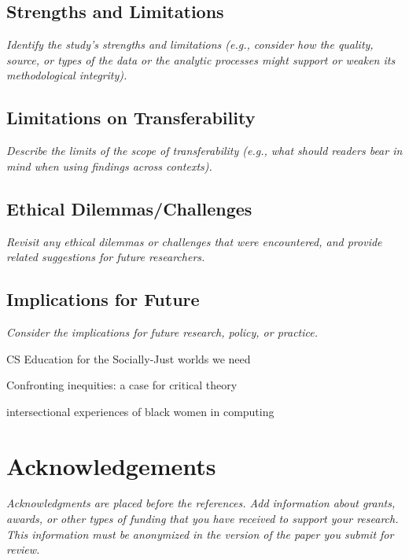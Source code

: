 \documentclass[acmsmall]{acmart}
\begin{document}
\subsection{Strengths and Limitations}

{\em\small Identify the study’s strengths and limitations (e.g., consider how the quality, source, or types of the data or the analytic processes might support or weaken its methodological integrity).}

\subsection{Limitations on Transferability}

{\em\small Describe the limits of the scope of transferability (e.g., what should readers bear in mind when using findings across contexts). }

\subsection{Ethical Dilemmas/Challenges}

{\em\small Revisit any ethical dilemmas or challenges that were encountered, and provide related suggestions for future researchers. }

\subsection{Implications for Future}

{\em\small Consider the implications for future research, policy, or practice.}

CS Education for the Socially-Just worlds we need

Confronting inequities: a case for critical theory

intersectional experiences of black women in computing

\section{Acknowledgements}

{\em\small Acknowledgments are placed before the references. Add information about grants, awards, or other types of funding that you have received to support your research. This information must be anonymized in the version of the paper you submit for review. }



\end{document}
